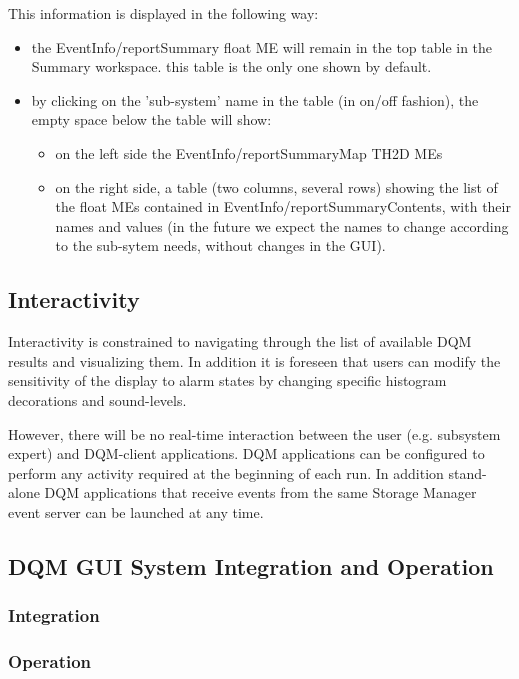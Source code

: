 This information is displayed in the following way:
\begin{itemize}
\item the EventInfo/reportSummary float ME will remain in the top table in the Summary workspace. this table is the only one shown by default.
\item by clicking on the 'sub-system' name in the table (in on/off fashion), the empty space below the table will show:
\begin{itemize}
\item on the left side the EventInfo/reportSummaryMap TH2D MEs
\item on the right side, a table (two columns, several rows) showing the list of the float MEs contained in EventInfo/reportSummaryContents, with their names and values (in the future we expect the names to change according to the sub-sytem needs, without changes in the GUI).
\end{itemize}
\end{itemize}

\subsection{Interactivity}

Interactivity is constrained to navigating through the list of available DQM results and visualizing them. In addition it is foreseen that users can modify the sensitivity of the display to alarm states by changing specific histogram decorations and sound-levels.

However, there will be no real-time interaction between the user (e.g. subsystem expert) and DQM-client applications. DQM applications can be configured to perform any activity required at the beginning of each run. In addition stand-alone DQM applications that receive events from the same Storage Manager event server can be launched at any time. 

\subsection{DQM GUI System Integration and Operation}

\subsubsection*{Integration}
\subsubsection*{Operation}
